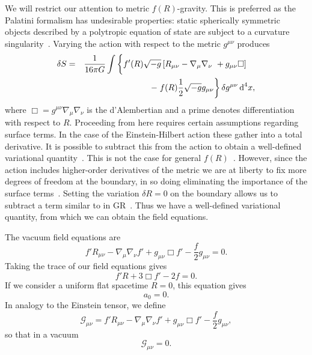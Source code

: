 \documentclass[aps,prd,amsfonts,amssymb,amsmath,nofootinbib,reprint,showpacs]{revtex4-1}
\newcommand{\dd}{\ensuremath{\text{d}}}
\newcommand{\recip}[1]{\ensuremath{\frac{1}{#1}}}
\begin{document}
We will restrict our attention to metric $f(R)$-gravity. This is preferred as the Palatini formalism has undesirable properties: static spherically symmetric objects described by a polytropic equation of state are subject to a curvature singularity~\cite{Barausse2008b, Barausse2008a, DeFelice2010}. Varying the action with respect to the metric $g^{\mu\nu}$ produces
\begin{eqnarray}
\delta S & = & \recip{16\pi G}\int\left\{f'(R)\sqrt{-g}\left[R_{\mu\nu} - \nabla_\mu\nabla_\nu\ + g_{\mu\nu}\Box\right] \hphantom{\frac{0}{0}} \vphantom{\frac{0}{0}} \right. \nonumber \\*
 & & - \left. f(R)\recip{2}\sqrt{-g}g_{\mu\nu}\right\}\delta g^{\mu\nu}\,\dd^4x,
\end{eqnarray}
where $\Box = g^{\mu\nu}\nabla_\mu\nabla_\nu$ is the d'Alembertian and a prime denotes differentiation with respect to $R$. Proceeding from here requires certain assumptions regarding surface terms. In the case of the Einstein-Hilbert action these gather into a total derivative. It is possible to subtract this from the action to obtain a well-defined variational quantity~\cite{York1972, Gibbons1977}. This is not the case for general $f(R)$~\cite{Madsen1989}. However, since the action includes higher-order derivatives of the metric we are at liberty to fix more degrees of freedom at the boundary, in so doing eliminating the importance of the surface terms~\cite{Dyer2009a, Sotiriou2010}. Setting the variation $\delta R = 0$ on the boundary allows us to subtract a term similar to in GR~\cite{Guarnizo2010}. Thus we have a well-defined variational quantity, from which we can obtain the field equations.

The vacuum field equations are
\begin{equation}
f'R_{\mu\nu} - \nabla_\mu\nabla_\nu f' + g_{\mu\nu}\Box f' - \frac{f}{2}g_{\mu\nu} = 0.
\label{eq:Field_eq}
\end{equation}
Taking the trace of our field equations gives
\begin{equation}
f'R + 3\Box f' - 2f = 0.
\label{eq:Trace_eq}
\end{equation}
If we consider a uniform flat spacetime $R = 0$, this equation gives~\cite{Capozziello2007}
\begin{equation}
a_0 = 0.
\label{eq:a_0}
\end{equation}
In analogy to the Einstein tensor, we define
\begin{equation}
\mathcal{G}_{\mu\nu} = f'R_{\mu\nu} - \nabla_\mu\nabla_\nu f' + g_{\mu\nu}\Box f' - \frac{f}{2}g_{\mu\nu},
\label{eq:G_tensor}
\end{equation}
so that in a vacuum
\begin{equation}
\mathcal{G}_{\mu\nu} = 0.
\end{equation}
\end{document}

